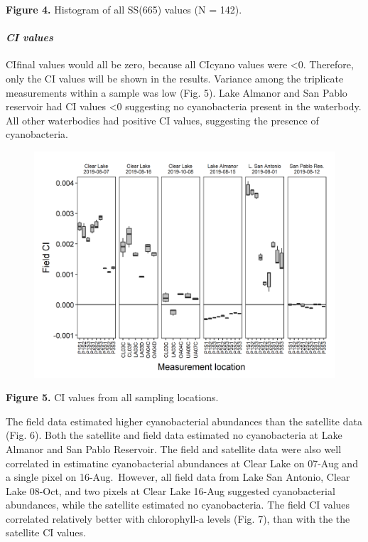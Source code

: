 \documentclass[]{article}
\let\oldparagraph\paragraph
\renewcommand{\paragraph}[1]{\oldparagraph{#1}\mbox{}}
\begin{document}
\textbf{Figure 4.} Histogram of all SS(665) values (N = 142).

\hypertarget{ci-values}{%
\paragraph{\texorpdfstring{\emph{CI
values}}{CI values}}\label{ci-values}}

CIfinal values would all be zero, because all CIcyano values were
\textless0. Therefore, only the CI values will be shown in the results.
Variance among the triplicate measurements within a sample was low (Fig.
5). Lake Almanor and San Pablo reservoir had CI values \textless0
suggesting no cyanobacteria present in the waterbody. All other
waterbodies had positive CI values, suggesting the presence of
cyanobacteria.

\begin{figure}

{\centering \includegraphics[width=0.6\linewidth]{../Data/Figures_output/ci_wbd} 

}

\end{figure}

\textbf{Figure 5.} CI values from all sampling locations.

The field data estimated higher cyanobacterial abundances than the
satellite data (Fig. 6). Both the satellite and field data estimated no
cyanobacteria at Lake Almanor and San Pablo Reservoir. The field and
satellite data were also well correlated in estimatinc cyanobacterial
abundances at Clear Lake on 07-Aug and a single pixel on
16-Aug.~However, all field data from Lake San Antonio, Clear Lake
08-Oct, and two pixels at Clear Lake 16-Aug suggested cyanobacterial
abundances, while the satellite estimated no cyanobacteria. The field CI
values correlated relatively better with chlorophyll-a levels (Fig. 7),
than with the the satellite CI values.
\end{document}
